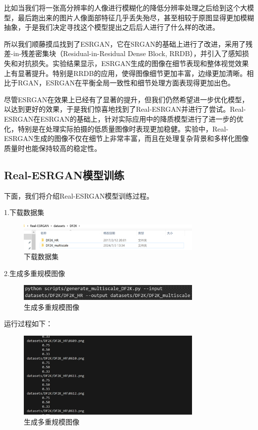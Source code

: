 \documentclass[UTF8,openany]{ctexbook}
\begin{document}
比如当我们将一张高分辨率的人像进行模糊化的降低分辨率处理之后给到这个大模型，最后跑出来的图片人像面部特征几乎丢失殆尽，甚至相较于原图显得更加模糊抽象，于是我们决定寻找这个模型提出之后后人进行了什么样的改进。

所以我们顺藤摸瓜找到了ESRGAN，它在SRGAN的基础上进行了改进，采用了残差-in-残差密集块（Residual-in-Residual Dense Block, RRDB），并引入了感知损失和对抗损失。实验结果显示，ESRGAN生成的图像在细节表现和整体视觉效果上有显著提升。特别是RRDB的应用，使得图像细节更加丰富，边缘更加清晰。相比于RGAN，ESRGAN在平衡全局一致性和细节处理方面表现得更加出色。\cite{ref2}

尽管ESRGAN在效果上已经有了显著的提升，但我们仍然希望进一步优化模型，以达到更好的效果，于是我们惊喜地找到了Real-ESRGAN并进行了尝试。Real-ESRGAN在ESRGAN的基础上，针对实际应用中的降质模型进行了进一步的优化，特别是在处理实际拍摄的低质量图像时表现更加稳健。实验中，Real-ESRGAN生成的图像不仅在细节上非常丰富，而且在处理复杂背景和多样化图像质量时也能保持较高的稳定性。\cite{ref3}

\subsection{Real-ESRGAN模型训练}

下面，我们将介绍Real-ESRGAN模型训练过程。

1.下载数据集

\begin{figure}[H]
  \centering
  \includegraphics[width=0.8\textwidth]{img/1.png}
  \caption{下载数据集}
\end{figure}

2.生成多重规模图像

\begin{figure}[H]
  \centering
  \includegraphics[width=0.8\textwidth]{img/2.png}
  \caption{生成多重规模图像}
\end{figure}

运行过程如下：
\begin{figure}[H]
  \centering
  \includegraphics[width=0.8\textwidth]{img/3.png}
  \caption{生成多重规模图像}
\end{figure}
\end{document}
